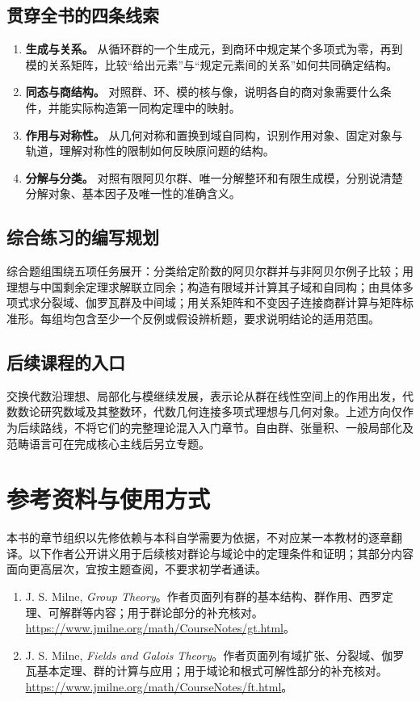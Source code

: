 \documentclass[UTF8,12pt,a4paper,fontset=fandol]{ctexbook}
\begin{document}
\section{贯穿全书的四条线索}
\begin{enumerate}
  \item \textbf{生成与关系。} 从循环群的一个生成元，到商环中规定某个多项式为零，再到模的关系矩阵，比较“给出元素”与“规定元素间的关系”如何共同确定结构。
  \item \textbf{同态与商结构。} 对照群、环、模的核与像，说明各自的商对象需要什么条件，并能实际构造第一同构定理中的映射。
  \item \textbf{作用与对称性。} 从几何对称和置换到域自同构，识别作用对象、固定对象与轨道，理解对称性的限制如何反映原问题的结构。
  \item \textbf{分解与分类。} 对照有限阿贝尔群、唯一分解整环和有限生成模，分别说清楚分解对象、基本因子及唯一性的准确含义。
\end{enumerate}

\section{综合练习的编写规划}
综合题组围绕五项任务展开：分类给定阶数的阿贝尔群并与非阿贝尔例子比较；用理想与中国剩余定理求解联立同余；构造有限域并计算其子域和自同构；由具体多项式求分裂域、伽罗瓦群及中间域；用关系矩阵和不变因子连接商群计算与矩阵标准形。每组均包含至少一个反例或假设辨析题，要求说明结论的适用范围。

\section{后续课程的入口}
交换代数沿理想、局部化与模继续发展，表示论从群在线性空间上的作用出发，代数数论研究数域及其整数环，代数几何连接多项式理想与几何对象。上述方向仅作为后续路线，不将它们的完整理论混入入门章节。自由群、张量积、一般局部化及范畴语言可在完成核心主线后另立专题。

\chapter{参考资料与使用方式}

本书的章节组织以先修依赖与本科自学需要为依据，不对应某一本教材的逐章翻译。以下作者公开讲义用于后续核对群论与域论中的定理条件和证明；其部分内容面向更高层次，宜按主题查阅，不要求初学者通读。

\begin{enumerate}
  \item J. S. Milne, \emph{Group Theory}。作者页面列有群的基本结构、群作用、西罗定理、可解群等内容；用于群论部分的补充核对。\url{https://www.jmilne.org/math/CourseNotes/gt.html}。
  \item J. S. Milne, \emph{Fields and Galois Theory}。作者页面列有域扩张、分裂域、伽罗瓦基本定理、群的计算与应用；用于域论和根式可解性部分的补充核对。\url{https://www.jmilne.org/math/CourseNotes/ft.html}。
\end{enumerate}
\end{document}
